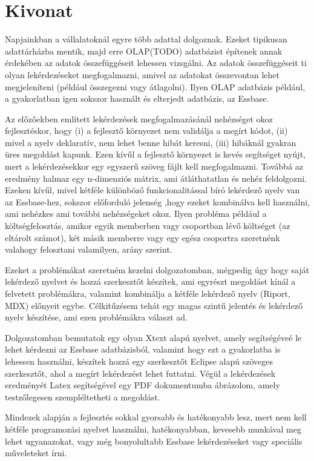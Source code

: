 \chapter*{Kivonat}
Napjainkban a vállalatoknál egyre több adattal dolgoznak. Ezeket
tipikusan adattárházba mentik, majd erre OLAP(TODO) adatbázist építenek annak
érdekében az adatok összefüggéseit lehessen vizsgálni. Az adatok összefüggéseit
ti olyan lekérdezéseket megfogalmazni, amivel az adatokat
összevontan lehet megjeleníteni (például összegezni vagy átlagolni).
Ilyen OLAP adatbázis például, a gyakorlatban igen sokszor használt és elterjedt
adatbázis, az Essbase.

Az előzőekben említett lekérdezések megfogalmazásánál 
nehézséget okoz fejlesztéskor, hogy (i) a fejlesztő környezet nem validálja a megírt kódot, (ii) mivel a nyelv deklaratív, nem lehet benne hibát keresni, (iii) hibáknál gyakran üres megoldást kapunk. Ezen kívűl a fejlesztő környezet is kevés segítséget nyújt, mert a lekérdezésekkor egy egyszerű szöveg fájlt kell megfogalmazni.
Továbbá az eredmény halmaz egy n-dimenziós mátrix, ami átláthatatlan és nehéz feldolgozni. Ezeken
kívűl, mivel kétféle különböző funkcionalitással bíró lekérdező nyelv van az Essbase-hez, sokszor előforduló jelenség 
,hogy ezeket kombinálva kell használni, ami nehézkes ami további nehézségeket okoz. Ilyen probléma
például a költségfelosztás, amikor egyik memberben vagy csoportban lévő
költséget (az eltárolt számot), két másik memberre vagy egy egész csoportra
szeretnénk valahogy felosztani valamilyen, arány szerint.

Ezeket a problémákat szeretném kezelni dolgozatomban, mégpedig úgy hogy saját lekérdező nyelvet és hozzá szerkesztőt készítek, ami egyrészt megoldást kínál a felvetett problémákra, valamint kombinálja a kétféle lekérdező
nyelv (Riport, MDX) előnyeit egybe. Célkitűzésem tehát egy magas szintű jelentés
és lekérdező nyelv készítése, ami ezen problémákra választ ad.

Dolgozatomban bemutatok egy olyan Xtext alapú nyelvet, amely segítségéveé le lehet kérdezni az
Essbase adatbázisból, valamint hogy ezt a gyakorlatba is lehessen használni,
készítek hozzá egy szerkesztőt Eclipse alapú szöveges szerkesztőt, ahol a megírt lekérdezést
lehet futtatni. Végül a lekérdezések eredményét Latex segítségével egy PDF dokumentumba ábrázolom, amely testzőlegesen szempléltetheti a megoldást.

Mindezek alapján a fejlesztés sokkal gyorsabb és hatékonyabb lesz, mert nem kell
kétféle programozási nyelvet használni, hatékonyabban, kevesebb munkával meg
lehet ugyanazokat, vagy még bonyolultabb Essbase lekérdezéseket vagy speciális
műveleteket írni.



 
